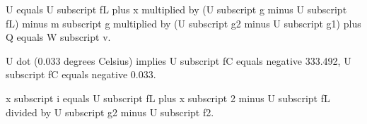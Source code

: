 U equals U subscript fL plus x multiplied by (U subscript g minus U subscript fL) minus m subscript g multiplied by (U subscript g2 minus U subscript g1) plus Q equals W subscript v.  

U dot (0.033 degrees Celsius) implies U subscript fC equals negative 333.492, U subscript fC equals negative 0.033.  

x subscript i equals U subscript fL plus x subscript 2 minus U subscript fL divided by U subscript g2 minus U subscript f2.